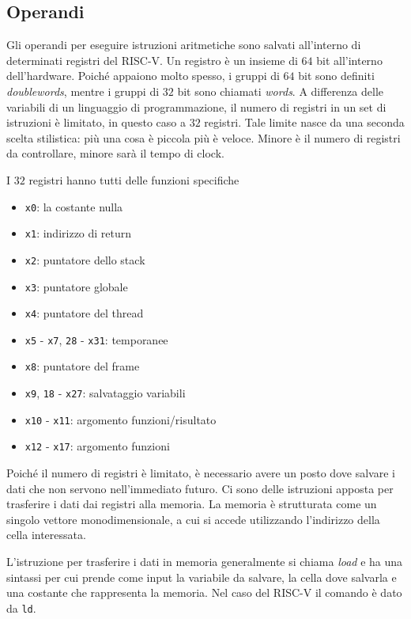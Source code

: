 \documentclass[a4paper,12pt]{article}
\theoremstyle{break}
\newcommand{\code}[1]{\texttt{#1}}
\numberwithin{equation}{section}
\begin{document}
\subsection{Operandi}
Gli operandi per eseguire istruzioni aritmetiche sono salvati all'interno di determinati registri del RISC-V. Un registro è un insieme di \(64\) bit all'interno dell'hardware. Poiché appaiono molto spesso, i gruppi di \(64\) bit sono definiti \textit{doublewords}, mentre i gruppi di \(32\) bit sono chiamati \textit{words}. A differenza delle variabili di un linguaggio di programmazione, il numero di registri in un set di istruzioni è limitato, in questo caso a \(32\) registri.
Tale limite nasce da una seconda scelta stilistica: più una cosa è piccola più è veloce. Minore è il numero di registri da controllare, minore sarà il tempo di clock.  

I \(32\) registri hanno tutti delle funzioni specifiche
\begin{itemize}
    \item \code{x0}: la costante nulla
    \item \code{x1}: indirizzo di return
    \item \code{x2}: puntatore dello stack
    \item \code{x3}: puntatore globale
    \item \code{x4}: puntatore del thread
    \item \code{x5} - \code{x7}, \code{28} - \code{x31}: temporanee
    \item \code{x8}: puntatore del frame
    \item \code{x9}, \code{18} - \code{x27}: salvataggio variabili
    \item \code{x10} - \code{x11}: argomento funzioni/risultato
    \item \code{x12} - \code{x17}: argomento funzioni
\end{itemize}

Poiché il numero di registri è limitato, è necessario avere un posto dove salvare i dati che non servono nell'immediato futuro. Ci sono delle istruzioni apposta per trasferire i dati dai registri alla memoria. La memoria è strutturata come un singolo vettore monodimensionale, a cui si accede utilizzando l'indirizzo della cella interessata. 

L'istruzione per trasferire i dati in memoria generalmente si chiama \textit{load} e ha una sintassi per cui prende come input la variabile da salvare, la cella dove salvarla e una costante che rappresenta la memoria. Nel caso del RISC-V il comando è dato da \code{ld}. 
\end{document}

